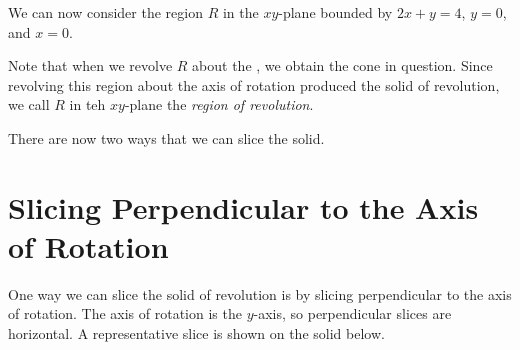 \documentclass{ximera}
\begin{document}
\begin{model}
We can now consider the region $R$ in the $xy$-plane bounded by $2x+y=4$, $y=0$, and $x=0$.  

 \begin{image}
            \end{image}


Note that when we revolve $R$ about the , we obtain the cone in question.  Since revolving this region about the axis of rotation produced the solid of revolution, we call $R$ in teh $xy$-plane the \emph{region of revolution}. 

There are now two ways that we can slice the solid.

\end{model}

\section{Slicing Perpendicular to the Axis of Rotation}

One way we can slice the solid of revolution is by slicing perpendicular to the axis of rotation.  The axis of rotation is the $y$-axis, so perpendicular slices are horizontal.  A representative slice is shown on the solid below.
\end{document}
